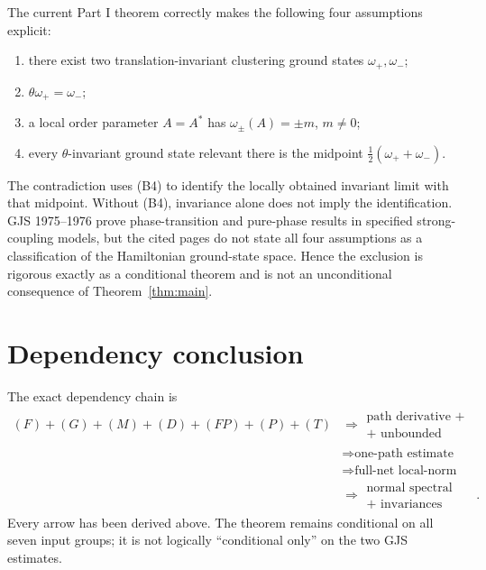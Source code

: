 \documentclass[11pt,a4paper]{article}
\begin{document}
The current Part I theorem correctly makes the following four assumptions explicit:

\begin{enumerate}[label=\textup{(B\arabic*)}]
\item there exist two translation-invariant clustering ground states
$\omega_+,\omega_-$;
\item $\theta\omega_+=\omega_-$;
\item a local order parameter $A=A^*$ has $\omega_\pm(A)=\pm m$, $m\ne0$;
\item every $\theta$-invariant ground state relevant there is the midpoint
$\tfrac12(\omega_++\omega_-)$.
\end{enumerate}

The contradiction uses (B4) to identify the locally obtained invariant limit with that
midpoint.  Without (B4), invariance alone does not imply the identification.  GJS
1975--1976 prove phase-transition and pure-phase results in specified strong-coupling
models, but the cited pages do not state all four assumptions as a classification of
the Hamiltonian ground-state space.  Hence the exclusion is rigorous exactly as a
conditional theorem and is not an unconditional consequence of Theorem~\ref{thm:main}.

\section{Dependency conclusion}

The exact dependency chain is
\begin{align*}
 \boxed{(F)+(G)+(M)+(D)+(FP)+(P)+(T)}
 &\Longrightarrow
 \boxed{\begin{gathered}\text{path derivative + filter}\\
                         \text{+ unbounded clustering}\end{gathered}}\\
 &\Longrightarrow \boxed{\text{one-path estimate}}\\
 &\Longrightarrow \boxed{\text{full-net local-norm limit}}\\
 &\Longrightarrow
 \boxed{\begin{gathered}\text{normal spectral ground state}\\
                         \text{+ invariances}\end{gathered}}.
\end{align*}
Every arrow has been derived above.  The theorem remains conditional on all seven input groups;
it is not logically ``conditional only'' on the two GJS estimates.
\end{document}
